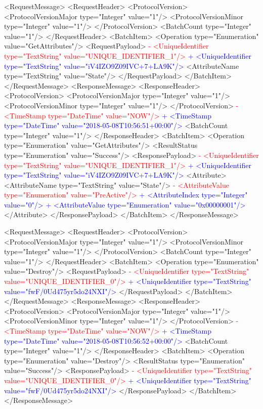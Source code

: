  \newpage
 <RequestMessage>
   <RequestHeader>
     <ProtocolVersion>
       <ProtocolVersionMajor type="Integer" value="1"/>
       <ProtocolVersionMinor type="Integer" value="1"/>
     </ProtocolVersion>
     <BatchCount type="Integer" value="1"/>
   </RequestHeader>
   <BatchItem>
     <Operation type="Enumeration" value="GetAttributes"/>
     <RequestPayload>
\textcolor{red}{-      <UniqueIdentifier type="TextString" value="UNIQUE_IDENTIFIER_1"/>}
\textcolor{blue}{+      <UniqueIdentifier type="TextString" value="iV4IZO9Z09IVC+7+LA9K"/>}
       <AttributeName type="TextString" value="State"/>
     </RequestPayload>
   </BatchItem>
 </RequestMessage>
 <ResponseMessage>
   <ResponseHeader>
     <ProtocolVersion>
       <ProtocolVersionMajor type="Integer" value="1"/>
       <ProtocolVersionMinor type="Integer" value="1"/>
     </ProtocolVersion>
\textcolor{red}{-    <TimeStamp type="DateTime" value="NOW"/>}
\textcolor{blue}{+    <TimeStamp type="DateTime" value="2018-05-08T10:56:51+00:00"/>}
     <BatchCount type="Integer" value="1"/>
   </ResponseHeader>
   <BatchItem>
     <Operation type="Enumeration" value="GetAttributes"/>
     <ResultStatus type="Enumeration" value="Success"/>
     <ResponsePayload>
\textcolor{red}{-      <UniqueIdentifier type="TextString" value="UNIQUE_IDENTIFIER_1"/>}
\textcolor{blue}{+      <UniqueIdentifier type="TextString" value="iV4IZO9Z09IVC+7+LA9K"/>}
       <Attribute>
         <AttributeName type="TextString" value="State"/>
\textcolor{red}{-        <AttributeValue type="Enumeration" value="PreActive"/>}
\textcolor{blue}{+        <AttributeIndex type="Integer" value="0"/>}
\textcolor{blue}{+        <AttributeValue type="Enumeration" value="0x00000001"/>}
       </Attribute>
     </ResponsePayload>
   </BatchItem>
 </ResponseMessage>
 
 \newpage
 <RequestMessage>
   <RequestHeader>
     <ProtocolVersion>
       <ProtocolVersionMajor type="Integer" value="1"/>
       <ProtocolVersionMinor type="Integer" value="1"/>
     </ProtocolVersion>
     <BatchCount type="Integer" value="1"/>
   </RequestHeader>
   <BatchItem>
     <Operation type="Enumeration" value="Destroy"/>
     <RequestPayload>
\textcolor{red}{-      <UniqueIdentifier type="TextString" value="UNIQUE_IDENTIFIER_0"/>}
\textcolor{blue}{+      <UniqueIdentifier type="TextString" value="fwF/0Ud475yr5do24NXI"/>}
     </RequestPayload>
   </BatchItem>
 </RequestMessage>
 <ResponseMessage>
   <ResponseHeader>
     <ProtocolVersion>
       <ProtocolVersionMajor type="Integer" value="1"/>
       <ProtocolVersionMinor type="Integer" value="1"/>
     </ProtocolVersion>
\textcolor{red}{-    <TimeStamp type="DateTime" value="NOW"/>}
\textcolor{blue}{+    <TimeStamp type="DateTime" value="2018-05-08T10:56:52+00:00"/>}
     <BatchCount type="Integer" value="1"/>
   </ResponseHeader>
   <BatchItem>
     <Operation type="Enumeration" value="Destroy"/>
     <ResultStatus type="Enumeration" value="Success"/>
     <ResponsePayload>
\textcolor{red}{-      <UniqueIdentifier type="TextString" value="UNIQUE_IDENTIFIER_0"/>}
\textcolor{blue}{+      <UniqueIdentifier type="TextString" value="fwF/0Ud475yr5do24NXI"/>}
     </ResponsePayload>
   </BatchItem>
 </ResponseMessage>
 
